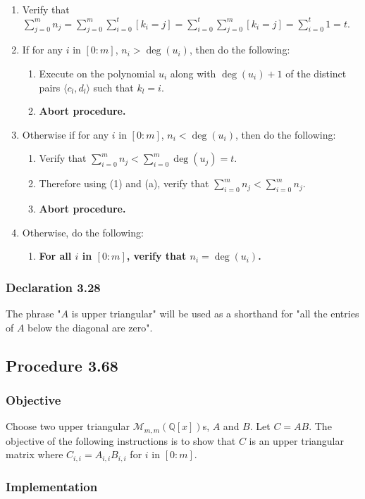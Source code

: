 \documentclass[twocolumn]{article}
\newcommand{\declaration}[1]{\subsubsection*{Declaration #1}\label{sec:declaration #1}}
\newcommand{\procedure}[2][]{\subsection*{Procedure #2 \ifthenelse{\equal{#1}{}}{}{(#1)}}\label{sec:procedure #2}}
\newcommand{\objective}{\subsubsection*{Objective}}
\newcommand{\implementation}{\subsubsection*{Implementation}}
\newcommand{\procedurehr}[2][]{\hyperref[sec:procedure #2]{\ifthenelse{\equal{#1}{}}{procedure #2}{#1}}}
\begin{document}
				\begin{enumerate}
					\item Verify that $\sum_{j=0}^m n_j=\sum_{j=0}^m\sum_{i=0}^t [k_i=j]=\sum_{i=0}^t\sum_{j=0}^m [k_i=j]=\sum_{i=0}^t 1=t$.
					\item If for any $i$ in $[0:m]$, $n_i>\deg(u_i)$, then do the following:
					\begin{enumerate}
						\item Execute \procedurehr{2.15} on the polynomial $u_i$ along with $\deg(u_i)+1$ of the distinct pairs $\langle c_l,d_l\rangle$ such that $k_l=i$.
						\item \textbf{Abort procedure.}
					\end{enumerate}
					\item Otherwise if for any $i$ in $[0:m]$, $n_i<\deg(u_i)$, then do the following:
					\begin{enumerate}
						\item Verify that $\sum_{i=0}^m n_j<\sum_{i=0}^m \deg(u_j)=t$.
						\item Therefore using (1) and (a), verify that $\sum_{i=0}^m n_j<\sum_{i=0}^m n_j$.
						\item \textbf{Abort procedure.}
					\end{enumerate}
					\item Otherwise, do the following:
					\begin{enumerate}
						\item \textbf{For all $i$ in $[0:m]$, verify that $n_i=\deg(u_i)$.}
					\end{enumerate}
				\end{enumerate}
		\declaration{3.28}
			The phrase "$A$ is upper triangular" will be used as a shorthand for "all the entries of $A$ below the diagonal are zero". 
		\procedure{3.68}
			\objective
				Choose two upper triangular $\mathcal{M}_{m,m}(\mathbb{Q}[x])$s, $A$ and $B$. Let $C=AB$. The objective of the following instructions is to show that $C$ is an upper triangular matrix where $C_{i,i}=A_{i,i}B_{i,i}$ for $i$ in $[0:m]$.
			\implementation
\end{document}
